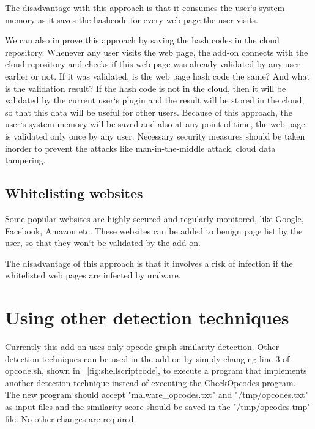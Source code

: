 The disadvantage with this approach is that it consumes the user`s system memory as it saves the hashcode for every web page the user visits. 

We can also improve this approach by saving the hash codes in the cloud repository. Whenever any user visits the web page, the add-on connects with the cloud repository and checks if this web page was already validated by any user earlier or not. If it was validated, is the web page hash code the same? And what is the validation result? If the hash code is not in the cloud, then it will be validated by the current user`s plugin and the result will be stored in the cloud, so that this data will be useful for other users. Because of this approach, the user`s system memory will be saved and also at any point of time, the web page is validated only once by any user. Necessary security measures should be taken inorder to prevent the attacks like man-in-the-middle attack, cloud data tampering. 
 
\subsection{Whitelisting websites} 
Some popular websites are highly secured and regularly monitored, like Google, Facebook, Amazon etc. These websites can be added to benign page list by the user, so that they won`t be validated by the add-on.

The disadvantage of this approach is that it involves a risk of infection if the whitelisted web pages are infected by malware.

\section{Using other detection techniques} \label{otherdetecttech}
Currently this add-on uses only opcode graph similarity detection. Other detection techniques can be used in the add-on by simply changing line 3 of opcode.sh, shown in ~\ref{fig:shellscriptcode}, to execute a program that implements another detection technique instead of executing the CheckOpcodes program. The new program should accept "malware\_opcodes.txt" and "/tmp/opcodes.txt" as input files and the similarity score should be saved in the "/tmp/opcodes.tmp" file. No other changes are required. 